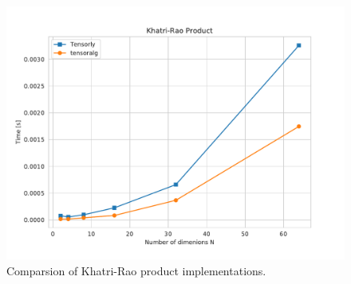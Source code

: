 \documentclass[12pt]{article}
\begin{document}
\begin{figure}[!ht]
       \centering 
       \includegraphics[width=0.55\linewidth]{figs/krao.pdf}
       \caption{Comparsion of Khatri-Rao product implementations.}
       \label{krao}
   \end{figure}
\end{document}

